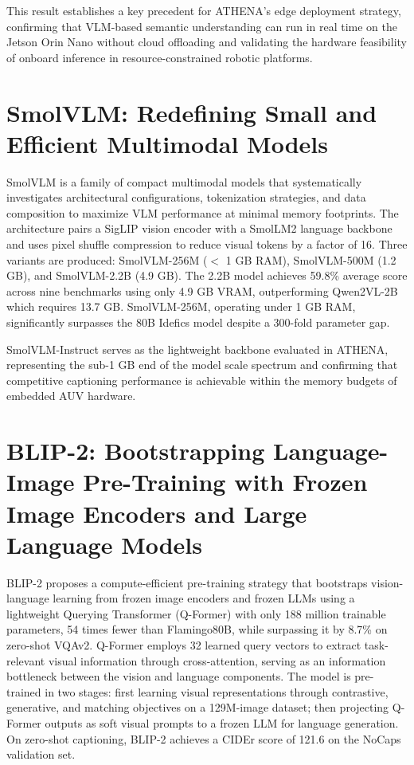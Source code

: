 This result establishes a key precedent for ATHENA's edge deployment strategy, confirming that VLM-based semantic understanding can run in real time on the Jetson Orin Nano without cloud offloading and validating the hardware feasibility of onboard inference in resource-constrained robotic platforms.

\section[Marafioti et al.]{SmolVLM: Redefining Small and Efficient Multimodal Models~\cite{marafioti4}}
SmolVLM is a family of compact multimodal models that systematically investigates architectural configurations, tokenization strategies, and data composition to maximize VLM performance at minimal memory footprints. The architecture pairs a SigLIP vision encoder with a SmolLM2 language backbone and uses pixel shuffle compression to reduce visual tokens by a factor of 16. Three variants are produced: SmolVLM-256M ($<$ 1 GB RAM), SmolVLM-500M (1.2 GB), and SmolVLM-2.2B (4.9 GB). The 2.2B model achieves 59.8\% average score across nine benchmarks using only 4.9 GB VRAM, outperforming Qwen2VL-2B which requires 13.7 GB. SmolVLM-256M, operating under 1 GB RAM, significantly surpasses the 80B Idefics model despite a 300-fold parameter gap.

SmolVLM-Instruct serves as the lightweight backbone evaluated in ATHENA, representing the sub-1 GB end of the model scale spectrum and confirming that competitive captioning performance is achievable within the memory budgets of embedded AUV hardware.

\section[J. Li, D. Li, Savarese \& Hoi]{BLIP-2: Bootstrapping Language-Image Pre-Training with Frozen Image Encoders and Large Language Models~\cite{blip2}}
BLIP-2 proposes a compute-efficient pre-training strategy that bootstraps vision-language learning from frozen image encoders and frozen LLMs using a lightweight Querying Transformer (Q-Former) with only 188 million trainable parameters, 54 times fewer than Flamingo80B, while surpassing it by 8.7\% on zero-shot VQAv2. Q-Former employs 32 learned query vectors to extract task-relevant visual information through cross-attention, serving as an information bottleneck between the vision and language components. The model is pre-trained in two stages: first learning visual representations through contrastive, generative, and matching objectives on a 129M-image dataset; then projecting Q-Former outputs as soft visual prompts to a frozen LLM for language generation. On zero-shot captioning, BLIP-2 achieves a CIDEr score of 121.6 on the NoCaps validation set.

